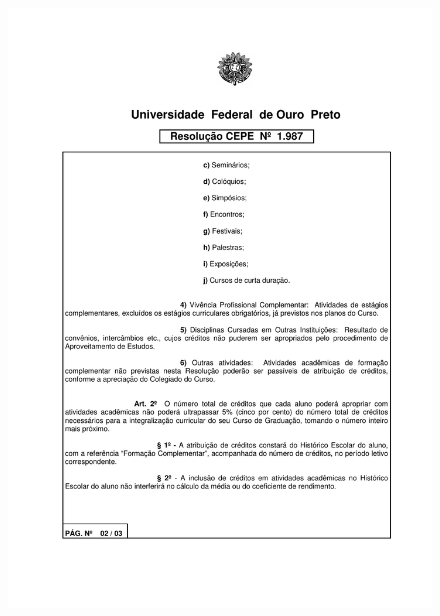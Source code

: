 \begin{figure}[p]
	\centering 
	\includegraphics[scale=0.7]{capitulos/resolucoes/cepe1987/cepe1987-2.pdf}
\end{figure} \pagebreak


